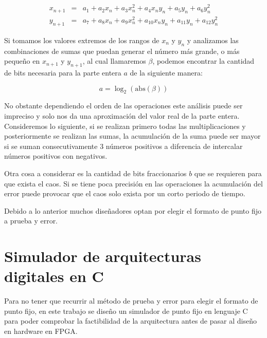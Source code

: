         \begin{equation*}
            \begin{array}{ccl}
                x_{n+1} & = &  a_{1} + a_{2}x_{n} + a_{3}x_{n}^{2} + a_{4}x_{n}y_{n} + a_{5}y_{n} + a_{6}y_{n}^{2}\\
                y_{n+1} & = &  a_{7} + a_{8}x_{n} + a_{9}x_{n}^{2} + a_{10}x_{n}y_{n} + a_{11}y_{n} + a_{12}y_{n}^{2}
            \end{array}
        \end{equation*}

        Si tomamos los valores extremos de los rangos de $x_{n}$ y $y_{n}$ y analizamos las combinaciones de sumas que puedan generar el número más grande, o más pequeño en $x_{n+1}$ y $y_{n+1}$, al cual llamaremos $\beta$, podemos encontrar la cantidad de bits necesaria para la parte entera $a$ de la siguiente manera:

        \begin{equation}
                a = \log_{2} ( \text{abs}( \beta ) )
            \label{eq:bits_enteros}
        \end{equation}

       No obstante dependiendo el orden de las operaciones este análisis puede ser impreciso y solo nos da una aproximación del valor real de la parte entera. Consideremos lo siguiente, si se realizan primero todas las multiplicaciones y posteriormente se realizan las sumas, la acumulación de la suma puede ser mayor si se suman consecutivamente 3 números positivos a diferencia de intercalar números positivos con negativos.
       
       Otra cosa a considerar es la cantidad de bits fraccionarios $b$ que se requieren para que exista el caos. Si se tiene poca precisión en las operaciones la acumulación del error puede provocar que el caos solo exista por un corto periodo de tiempo. 

       Debido a lo anterior muchos diseñadores optan por elegir el formato de punto fijo a prueba y error. 

    \section{Simulador de arquitecturas digitales en C}

        Para no tener que recurrir al método de prueba y error para elegir el formato de punto fijo, en este trabajo se diseño un simulador de punto fijo en lenguaje C para poder comprobar la factibilidad de la arquitectura antes de pasar al diseño en hardware en FPGA. 

